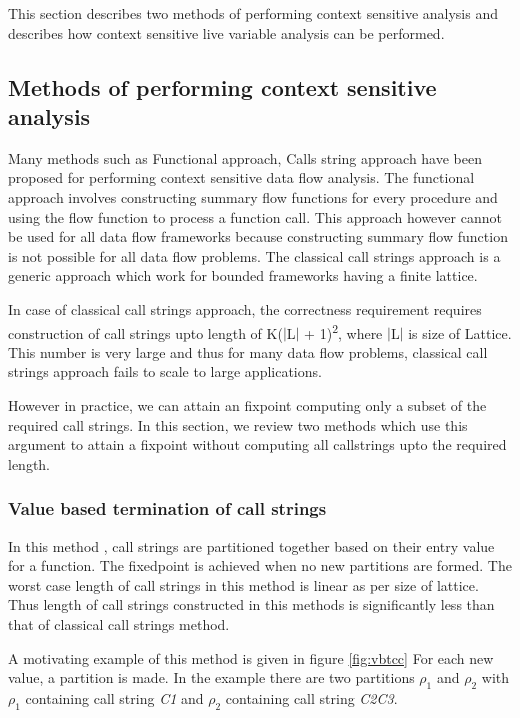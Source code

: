 \documentclass[12pt]{report}
\begin{document}
This section describes two methods of performing context sensitive analysis and describes how context sensitive live variable analysis can be performed.

\subsection{Methods of performing context sensitive analysis}
Many methods such as Functional approach, Calls string approach have been proposed for performing context sensitive data flow analysis. The functional approach involves constructing summary flow functions for every procedure and using the flow function to process a function call. This approach however cannot be used for all data flow frameworks because constructing summary flow function is not possible for all data flow problems. The classical call strings approach is a generic approach which work for bounded frameworks having a finite lattice.

In case of classical call strings approach, the correctness requirement requires construction of call strings upto length of K($\vert$L$\vert$ + 1)\textsuperscript{2}, where $\vert$L$\vert$ is size of Lattice. This number is very large and thus for many data flow problems, classical call strings approach fails to scale to large applications.

However in practice, we can attain an fixpoint computing only a subset of the required call strings. In this section, we review two methods which use this argument to attain a fixpoint without computing all callstrings upto the required length.

\subsubsection{Value based termination of call strings}

In this method \cite{vbtcc}, call strings are partitioned together based on their entry value for a function. The fixedpoint is achieved when no new partitions are formed. The worst case length of call strings in this method is linear as per size of lattice. Thus length of call strings constructed in this methods is significantly less than that of classical call strings method.

A motivating example of this method is given in figure \ref{fig:vbtcc} For each new value, a partition is made. In the example there are two partitions $\rho_1$ and $\rho_2$ with $\rho_1$ containing call string \emph{C1} and $\rho_2$ containing call string \emph{C2C3}.
\end{document}
